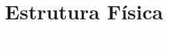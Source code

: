 \documentclass[11pt,fleqn]{book} %
\begin{document}
%	


\chapter{Estrutura Física}
\vspace{6em}
\begin{flushright}
	\textit{\textcolor{white}{Foto: Adriano Darosci}}
\end{flushright}
\vspace{12em}
\end{document}
